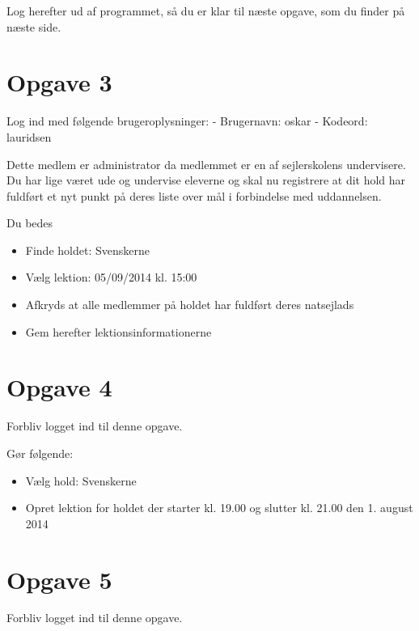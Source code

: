 Log herefter ud af programmet, så du er klar til næste opgave, som du finder på næste side.

\newpage
 
\section{Opgave 3}

Log ind med følgende brugeroplysninger: 
\newline - Brugernavn: oskar
\newline - Kodeord: lauridsen

Dette medlem er administrator da medlemmet er en af sejlerskolens undervisere.
Du har lige været ude og undervise eleverne og skal nu registrere at dit hold har fuldført et nyt punkt på deres liste over mål i forbindelse med uddannelsen.

Du bedes 

\begin{itemize}
\item Finde holdet: Svenskerne
\item Vælg lektion: 05/09/2014 kl. 15:00 
\item Afkryds at alle medlemmer på holdet har fuldført deres natsejlads
\item Gem herefter lektionsinformationerne
\end{itemize}


\section{Opgave 4}

Forbliv logget ind til denne opgave.

Gør følgende:
\begin{itemize}
\item Vælg hold: Svenskerne
\item Opret lektion for holdet der starter kl. 19.00 og slutter kl. 21.00 den 1. august 2014
\end{itemize}


\section{Opgave 5}

Forbliv logget ind til denne opgave.

